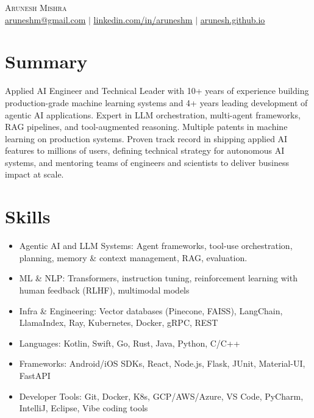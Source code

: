 \documentclass[letterpaper,9pt]{article}
\newcommand{\resumeItem}[1]{
  \item\small{
    {#1 \vspace{-2pt}}
  }
}
\begin{document}

\begin{center}
    {\LARGE \scshape Arunesh \hspace{3mm} Mishra} \\ \vspace{1pt}
    \footnotesize{\href{mailto:aruneshm@gmail.com}{\underline{aruneshm@gmail.com}} $|$ 
    \href{https://linkedin.com/in/...}{\underline{linkedin.com/in/aruneshm}} $|$
    \href{https://arunesh.github.io}{\underline{arunesh.github.io}}}
\end{center}



\section{Summary}
Applied AI Engineer and Technical Leader with 10+ years of experience building production-grade machine learning systems and 4+ years leading development of agentic AI applications. Expert in LLM orchestration, multi-agent frameworks, RAG pipelines, and tool-augmented reasoning. Multiple patents in machine learning on production systems. Proven track record in shipping applied AI features to millions of users, defining technical strategy for autonomous AI systems, and mentoring teams of engineers and scientists to deliver business impact at scale.

\section{Skills}
\begin{itemize}[leftmargin=3.5em, itemsep=0pt, label=\tiny$\bullet$]
  \resumeItem {Agentic AI and LLM Systems: Agent frameworks, tool-use orchestration, planning, memory \& context management, RAG, evaluation.}
  \resumeItem {ML \& NLP: Transformers, instruction tuning, reinforcement learning with human feedback (RLHF), multimodal models}
  \resumeItem {Infra \& Engineering: Vector databases (Pinecone, FAISS), LangChain, LlamaIndex, Ray, Kubernetes, Docker, gRPC, REST}
  \resumeItem {Languages: Kotlin, Swift, Go, Rust, Java, Python, C/C++} 
  \resumeItem {Frameworks: Android/iOS SDKs, React, Node.js, Flask, JUnit, Material-UI, FastAPI}
  \resumeItem {Developer Tools: Git, Docker, K8s, GCP/AWS/Azure, VS Code, PyCharm, IntelliJ, Eclipse, Vibe coding tools}
\end{itemize}
\end{document}
